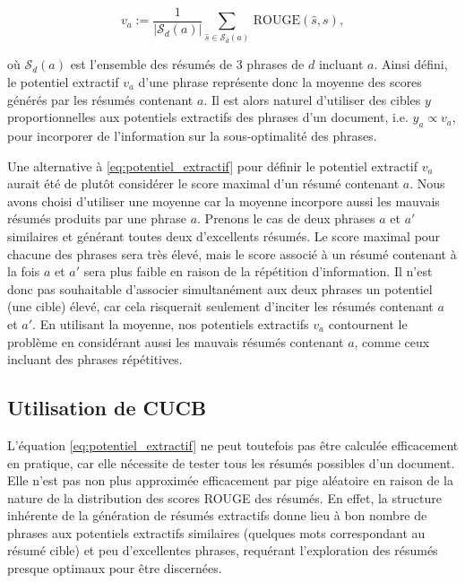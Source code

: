 \begin{equation}
    v_a := \frac{1}{|\mathcal{S}_d (a)|}\sum_{\hat{s} \in \mathcal{S}_d(a)} \, \text{ROUGE}(\hat{s}, s),
    \label{eq:potentiel_extractif}
\end{equation}

où $\mathcal{S}_d(a)$ est l'ensemble des résumés de 3 phrases de $d$ incluant $a$.
Ainsi défini, le potentiel extractif $v_a$ d'une phrase représente donc la moyenne 
des scores générés par les résumés contenant $a$.
Il est alors naturel d'utiliser des cibles $y$ proportionnelles aux potentiels 
extractifs des phrases d'un document, i.e. $y_a \propto v_a$,
pour incorporer de l'information sur la sous-optimalité des phrases.

Une alternative à \eqref{eq:potentiel_extractif} pour définir le potentiel 
extractif $v_a$ aurait été de plutôt considérer le score maximal d'un résumé 
contenant $a$.
Nous avons choisi d'utiliser une moyenne car la moyenne 
incorpore aussi les mauvais résumés produits par une phrase $a$.
Prenons le cas de deux phrases $a$ et $a'$ similaires et
générant toutes deux d'excellents résumés.
Le score maximal pour chacune des phrases sera très élevé,
mais le score associé à un résumé contenant à la fois $a$ et $a'$ 
sera plus faible en raison de la répétition d'information.
Il n'est donc pas souhaitable d'associer simultanément aux deux phrases 
un potentiel (une cible) élevé, car cela risquerait seulement 
d'inciter les résumés contenant $a$ et $a'$.
En utilisant la moyenne, nos potentiels extractifs $v_a$ contournent 
le problème en considérant aussi les mauvais résumés contenant $a$,
comme ceux incluant des phrases répétitives.

\subsection{Utilisation de CUCB}

L'équation \eqref{eq:potentiel_extractif} ne peut toutefois pas être 
calculée efficacement en pratique, car elle nécessite de 
tester tous les résumés possibles d'un document.
Elle n'est pas non plus approximée efficacement par pige 
aléatoire en raison de la nature de la distribution 
des scores ROUGE des résumés.
En effet, la structure inhérente de la génération 
de résumés extractifs donne lieu à bon nombre de phrases aux 
potentiels extractifs similaires (quelques mots correspondant au résumé cible) 
et peu d'excellentes phrases, requérant l'exploration des 
résumés presque optimaux pour être discernées.

